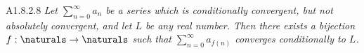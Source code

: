 \begin{theorem}{A1.8.2.8}
    \emph{Let $\sum_{n=0}^{\infty} a_n$ be a series which is conditionally convergent,
    but not absolutely convergent, and let $L$ be any real number. Then there exists
    a bijection $f: \naturals \to \naturals$ such that $\sum_{n=0}^{\infty} a_{f(n)}$
    converges conditionally to $L$.}
\end{theorem}
